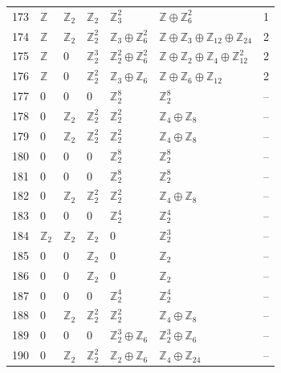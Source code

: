 \documentclass[10pt]{article}
\begin{document}
\begin{longtable}{rlllllr}
173 & $\mathbb{Z}$ & $\mathbb{Z}_{2}$ & $\mathbb{Z}_{2}$ & $\mathbb{Z}_{3}^{2}$ & $\mathbb{Z}\oplus \mathbb{Z}_{6}^{2}$ & 1 \\
174 & $\mathbb{Z}$ & $\mathbb{Z}_{2}$ & $\mathbb{Z}_{2}^{2}$ & $\mathbb{Z}_{3}\oplus \mathbb{Z}_{6}^{2}$ & $\mathbb{Z}\oplus \mathbb{Z}_{3}\oplus \mathbb{Z}_{12}\oplus \mathbb{Z}_{24}$ & 2 \\
175 & $\mathbb{Z}$ & $0$ & $\mathbb{Z}_{2}^{3}$ & $\mathbb{Z}_{2}^{2}\oplus \mathbb{Z}_{6}^{2}$ & $\mathbb{Z}\oplus \mathbb{Z}_{2}\oplus \mathbb{Z}_{4}\oplus \mathbb{Z}_{12}^{2}$ & 2 \\
176 & $\mathbb{Z}$ & $0$ & $\mathbb{Z}_{2}^{2}$ & $\mathbb{Z}_{3}\oplus \mathbb{Z}_{6}$ & $\mathbb{Z}\oplus \mathbb{Z}_{6}\oplus \mathbb{Z}_{12}$ & 2 \\
177 & $0$ & $0$ & $0$ & $\mathbb{Z}_{2}^{8}$ & $\mathbb{Z}_{2}^{8}$ & -- \\
178 & $0$ & $\mathbb{Z}_{2}$ & $\mathbb{Z}_{2}^{2}$ & $\mathbb{Z}_{2}^{2}$ & $\mathbb{Z}_{4}\oplus \mathbb{Z}_{8}$ & -- \\
179 & $0$ & $\mathbb{Z}_{2}$ & $\mathbb{Z}_{2}^{2}$ & $\mathbb{Z}_{2}^{2}$ & $\mathbb{Z}_{4}\oplus \mathbb{Z}_{8}$ & -- \\
180 & $0$ & $0$ & $0$ & $\mathbb{Z}_{2}^{8}$ & $\mathbb{Z}_{2}^{8}$ & -- \\
181 & $0$ & $0$ & $0$ & $\mathbb{Z}_{2}^{8}$ & $\mathbb{Z}_{2}^{8}$ & -- \\
182 & $0$ & $\mathbb{Z}_{2}$ & $\mathbb{Z}_{2}^{2}$ & $\mathbb{Z}_{2}^{2}$ & $\mathbb{Z}_{4}\oplus \mathbb{Z}_{8}$ & -- \\
183 & $0$ & $0$ & $0$ & $\mathbb{Z}_{2}^{4}$ & $\mathbb{Z}_{2}^{4}$ & -- \\
184 & $\mathbb{Z}_{2}$ & $\mathbb{Z}_{2}$ & $\mathbb{Z}_{2}$ & $0$ & $\mathbb{Z}_{2}^{3}$ & -- \\
185 & $0$ & $0$ & $\mathbb{Z}_{2}$ & $0$ & $\mathbb{Z}_{2}$ & -- \\
186 & $0$ & $0$ & $\mathbb{Z}_{2}$ & $0$ & $\mathbb{Z}_{2}$ & -- \\
187 & $0$ & $0$ & $0$ & $\mathbb{Z}_{2}^{4}$ & $\mathbb{Z}_{2}^{4}$ & -- \\
188 & $0$ & $\mathbb{Z}_{2}$ & $\mathbb{Z}_{2}^{2}$ & $\mathbb{Z}_{2}^{2}$ & $\mathbb{Z}_{4}\oplus \mathbb{Z}_{8}$ & -- \\
189 & $0$ & $0$ & $0$ & $\mathbb{Z}_{2}^{3}\oplus \mathbb{Z}_{6}$ & $\mathbb{Z}_{2}^{3}\oplus \mathbb{Z}_{6}$ & -- \\
190 & $0$ & $\mathbb{Z}_{2}$ & $\mathbb{Z}_{2}^{2}$ & $\mathbb{Z}_{2}\oplus \mathbb{Z}_{6}$ & $\mathbb{Z}_{4}\oplus \mathbb{Z}_{24}$ & -- \\

\end{longtable}
\end{document}

